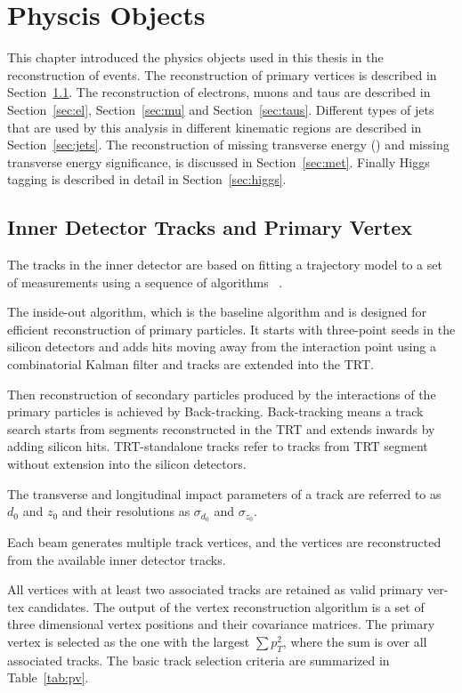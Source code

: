 \chapter{Physcis Objects}

\label{ch:objects}
This chapter introduced the physics objects used in this thesis in the reconstruction of events. 
 The reconstruction of primary vertices is described in Section~\ref{sec:pv}. 
The reconstruction of electrons, muons and taus are described in Section~\ref{sec:el}, Section~\ref{sec:mu} and Section~\ref{sec:taus}.
Different types of jets that are used by this analysis in different kinematic regions are described in Section~\ref{sec:jets}. 
The reconstruction of missing transverse energy (\met) and missing transverse energy significance, is discussed in Section~\ref{sec:met}. 
Finally Higgs tagging is described in detail in Section~\ref{sec:higgs}. 


\section{Inner Detector Tracks and Primary Vertex}
\label{sec:pv}
\par The tracks in the inner detector are based on fitting a trajectory model to a set of measurements using a sequence of algorithms
~\cite{Cornelissen:1020106}.
\par The inside-out algorithm, which is the baseline algorithm and is designed for efficient reconstruction of primary particles. 
It starts with three-point seeds in the silicon detectors and adds hits moving away from the interaction point using a combinatorial Kalman filter 
and tracks are extended into the TRT.
\par Then reconstruction of secondary particles produced by the interactions of the primary particles is achieved by Back-tracking. 
Back-tracking means a track search starts from segments reconstructed in the TRT and extends inwards by adding silicon hits. 
TRT-standalone tracks refer to tracks from TRT segment without extension into the silicon detectors.					
\par The transverse and longitudinal impact parameters of a track are referred to as $d_0$ and $z_0$ and their resolutions as $\sigma_{d_0}$ 
and $\sigma_{z_0}$. 
\par Each beam generates multiple track vertices, and the vertices are reconstructed from the available inner detector tracks.
\par All vertices with at least two associated tracks are retained as valid primary ver- tex candidates. 
The output of the vertex reconstruction algorithm is a set of three dimensional vertex positions and their covariance matrices. 
The primary vertex is selected as the one with the largest $\sum p_T^2$, where the sum is over all associated tracks. 
The basic track selection criteria are summarized in Table~\ref{tab:pv}.

